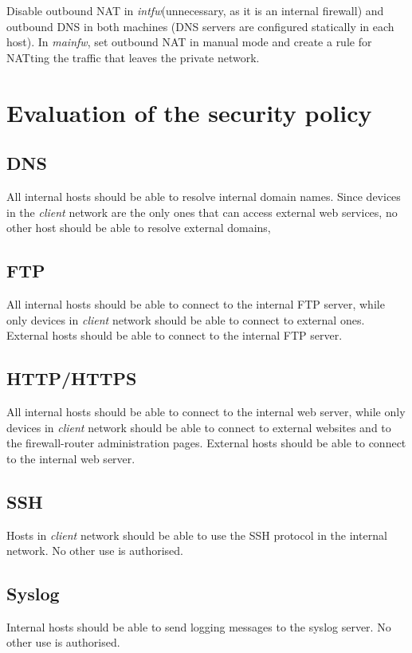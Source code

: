 \documentclass{homework}
\newcommand{\intfw}{\textit{intfw}\xspace}
\newcommand{\mainfw}{\textit{mainfw}\xspace}
\begin{document}
    Disable outbound NAT in \intfw (unnecessary, as it is an internal firewall) and outbound DNS in both machines (DNS servers are configured statically in each host). In \mainfw, set outbound NAT in manual mode and create a rule for NATting the traffic that leaves the private network.
    
    
    \section{Evaluation of the security policy}
    \subsection{DNS}
    All internal hosts should be able to resolve internal domain names.
    Since devices in the \textit{client} network are the only ones that can access external web services, no other host should be able to resolve external domains,
    
    \subsection{FTP}
    All internal hosts should be able to connect to the internal FTP server, while only devices in \textit{client} network should be able to connect to external ones.
    External hosts should be able to connect to the internal FTP server.
    
    \subsection{HTTP/HTTPS}
    All internal hosts should be able to connect to the internal web server, while only devices in \textit{client} network should be able to connect to external websites and to the firewall-router administration pages.
    External hosts should be able to connect to the internal web server.
    
    \subsection{SSH}
    Hosts in \textit{client} network should be able to use the SSH protocol in the internal network.
    No other use is authorised.
    
    \subsection{Syslog}
    Internal hosts should be able to send logging messages to the syslog server.
    No other use is authorised.
    
\end{document}
